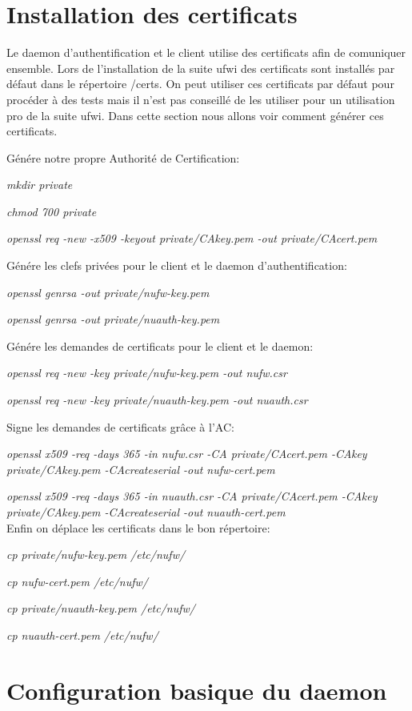 \documentclass[12pt]{report}
\begin{document}
\begin{itemize}
\section{Installation des certificats}

Le daemon d'authentification et le client utilise des certificats afin de comuniquer ensemble. Lors de l'installation de la
suite ufwi des certificats sont installés par défaut dans le répertoire /certs. On peut utiliser ces certificats par défaut 
pour procéder à des tests mais il n'est pas conseillé de les utiliser pour un utilisation pro de la suite ufwi. Dans cette 
section nous allons voir comment générer ces certificats.

Génére notre propre Authorité de Certification:

\textit{mkdir private}

\textit{chmod 700 private}

\textit{openssl req -new -x509 -keyout private/CAkey.pem -out private/CAcert.pem}

Génére les clefs privées pour le client et le daemon d'authentification:

\textit{openssl genrsa -out private/nufw-key.pem}

\textit{openssl genrsa -out private/nuauth-key.pem}

Génére les demandes de certificats pour le client et le daemon:

\textit{openssl req -new -key private/nufw-key.pem -out nufw.csr}

\textit{openssl req -new -key private/nuauth-key.pem -out nuauth.csr}

Signe les demandes de certificats grâce à l’AC:

\textit{openssl x509 -req -days 365 -in nufw.csr -CA private/CAcert.pem -CAkey private/CAkey.pem -CAcreateserial -out nufw-cert.pem}

\textit{openssl x509 -req -days 365 -in nuauth.csr -CA private/CAcert.pem -CAkey private/CAkey.pem -CAcreateserial -out nuauth-cert.pem}
\\
Enfin on déplace les certificats dans le bon répertoire:

\textit{cp private/nufw-key.pem /etc/nufw/}

\textit{cp nufw-cert.pem /etc/nufw/}

\textit{cp private/nuauth-key.pem /etc/nufw/}

\textit{cp nuauth-cert.pem /etc/nufw/}

\section{Configuration basique du daemon}


\end{itemize}
\end{document}
